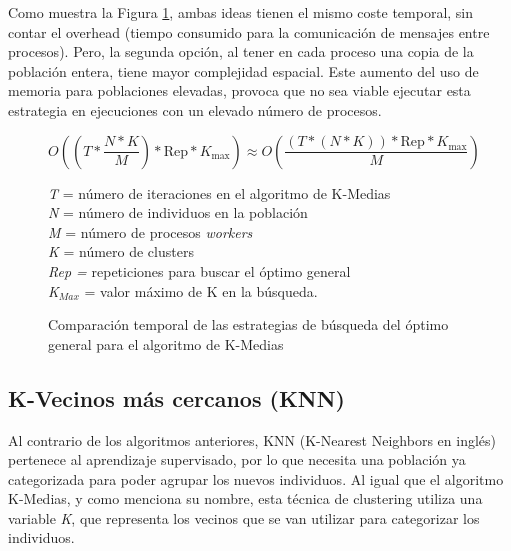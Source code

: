 		Como muestra la Figura \ref{fig:KMedias_comp}, ambas ideas tienen el mismo coste temporal, sin contar el overhead (tiempo consumido para la comunicación de mensajes entre procesos). Pero, la segunda opción, al tener en cada proceso una copia de la población entera, tiene mayor complejidad espacial. Este aumento del uso de memoria para poblaciones elevadas, provoca que no sea viable ejecutar esta estrategia en ejecuciones con un elevado número de procesos.
		
		\begin{figure} [!h]
			\begin{mdframed}[roundcorner=5pt]
				\[
				O\left((T * \frac{N * K}{M}) * \text{Rep} * K_{\text{max}}\right) \approx O\left(\frac{{(T * (N * K)) * \text{Rep} * K_{\text{max}}}}{{M}}\right)
				\]
				
				
				
				\begin{tcolorbox}[boxrule=0.5pt, fontupper=\small]
					
					\textit{T} = número de iteraciones en el algoritmo de K-Medias\\
					\textit{N} = número de individuos en la población\\
					\textit{M} = número de procesos \textit{workers}\\
					\textit{K} = número de clusters\\
					\textit{Rep = }repeticiones para buscar el óptimo general\\
					\textit{K\(_{Max}\)} = valor máximo de K en la búsqueda.				
					
				\end{tcolorbox}
				
			\end{mdframed}
			\caption{Comparación temporal de las estrategias de búsqueda del óptimo general para el algoritmo de K-Medias}
			\label{fig:KMedias_comp}
		\end{figure}
		
		
		
		
	\subsection{K-Vecinos más cercanos (KNN)}
	\label{cap:3_2_3}
		Al contrario de los algoritmos anteriores, KNN (K-Nearest Neighbors en inglés) pertenece al aprendizaje supervisado, por lo que necesita una población ya categorizada para poder agrupar los nuevos individuos. Al igual que el algoritmo K-Medias, y como menciona su nombre, esta técnica de clustering utiliza una variable \textit{K}, que representa los vecinos que se van utilizar para categorizar los individuos.
		
